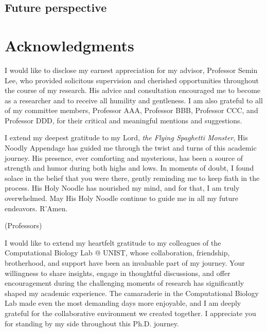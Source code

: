 \documentclass[11pt, a4paper, onecolumn, oneside]{report}
\begin{document}
        \subsection{Future perspective}
        \newpage

    
    
    \clearpage

    \section*{\hfill \Large Acknowledgments \hfill}
        I would like to disclose my earnest appreciation for my advisor, Professor Semin Lee, who provided solicitous supervision and cherished opportunities throughout the course of my research. His advice and consultation encouraged me to become as a researcher and to receive all humility and gentleness. I am also grateful to all of my committee members, Professor AAA, Professor BBB, Professor CCC, and Professor DDD, for their critical and meaningful mentions and suggestions.

        I extend my deepest gratitude to my Lord, \textit{the Flying Spaghetti Monster}, His Noodly Appendage has guided me through the twist and turns of this academic journey. His presence, ever comforting and mysterious, has been a source of strength and humor during both highs and lows. In moments of doubt, I found solace in the belief that you were there, gently reminding me to keep fiath in the process. His Holy Noodle has nourished my mind, and for that, I am truly overwhelmed. May His Holy Noodle continue to guide me in all my future endeavors. R'Amen.

        (Professors)

        I would like to extend my heartfelt gratitude to my colleagues of the Computational Biology Lab @ UNIST, whose collaboration, friendship, brotherhood, and support have been an invaluable part of my journey. Your willingness to share insights, engage in thoughtful discussions, and offer encouragement during the challenging moments of research has significantly shaped my academic experience. The camaraderie in the Computational Biology Lab made even the most demanding days more enjoyable, and I am deeply grateful for the collaborative environment we created together. I appreciate you for standing by my side throughout this Ph.D. journey.
\end{document}
